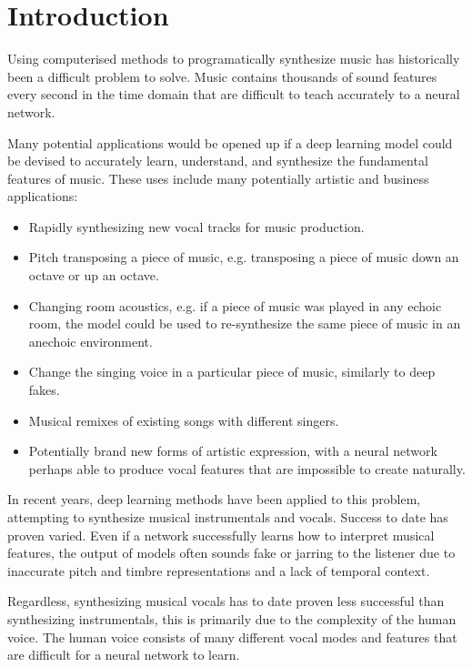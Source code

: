\chapter{Introduction}
\label{ch:introduction}

Using computerised methods to programatically synthesize music has historically been a difficult problem to solve. Music contains thousands of sound features every second in the time domain that are difficult to teach accurately to a neural network.

Many potential applications would be opened up if a deep learning model could be devised to accurately learn, understand, and synthesize the fundamental features of music. These uses include many potentially artistic and business applications:

\begin{itemize}
    \item Rapidly synthesizing new vocal tracks for music production.
    \item Pitch transposing a piece of music, e.g. transposing a piece of music down an octave or up an octave.
    \item Changing room acoustics, e.g. if a piece of music was played in any echoic room, the model could be used to re-synthesize the same piece of music in an anechoic environment.
    \item Change the singing voice in a particular piece of music, similarly to deep fakes.
    \item Musical remixes of existing songs with different singers.
    \item Potentially brand new forms of artistic expression, with a neural network perhaps able to produce vocal features that are impossible to create naturally.
\end{itemize}

In recent years, deep learning methods have been applied to this problem, attempting to synthesize musical instrumentals and vocals. Success to date has proven varied. Even if a network successfully learns how to interpret musical features, the output of models often sounds fake or jarring to the listener due to inaccurate pitch and timbre representations and a lack of temporal context.

Regardless, synthesizing musical vocals has to date proven less successful than synthesizing instrumentals, this is primarily due to the complexity of the human voice. The human voice consists of many different vocal modes and features that are difficult for a neural network to learn.

